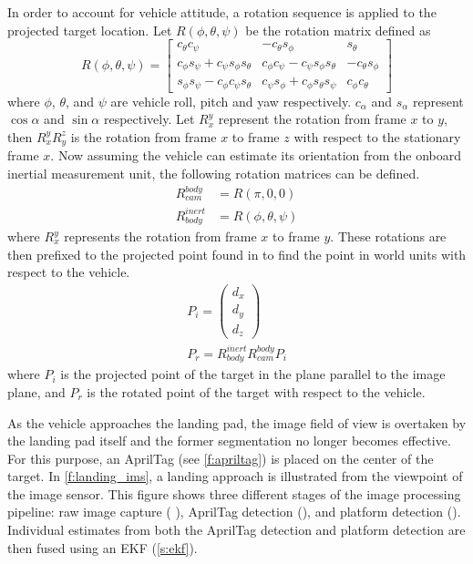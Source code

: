 In order to account for vehicle attitude, a rotation sequence is applied to the projected target location.
Let $R\left(\phi, \theta, \psi\right)$ be the rotation matrix defined as
\begin{equation}
    R(\phi,\theta,\psi) = 
    \begin{bmatrix}
            c_{\theta}c_{\psi}                           & -c_{\theta}s_{\phi}                           & s_{\theta}\\
            c_{\phi}s_{\psi} + c_{\psi}s_{\phi}s_{\theta} & c_{\phi}c_{\psi} - c_{\psi}s_{\phi}s_{\theta} & -c_{\theta}s_{\phi}\\
            s_{\phi}s_{\psi} -c_{\phi}c_{\psi}s_{\theta} & c_{\psi}s_{\phi} + c_{\phi}s_{\theta}s_{\psi} & c_{\phi}c_{\theta}
    \end{bmatrix}
\end{equation}
where $\phi$, $\theta$, and $\psi$ are vehicle roll, pitch and yaw respectively. $c_{\alpha}$ and $s_{\alpha}$
represent $\cos{\alpha}$ and $\sin{\alpha}$ respectively. Let $R_x^y$ represent the rotation from frame $x$ to
$y$, then $R_x^yR_y^z$ is the rotation from frame $x$ to frame $z$ with respect to the stationary frame $x$.
Now assuming the vehicle can estimate its orientation from the onboard inertial measurement unit, the
following rotation matrices can be defined.
\begin{align}
    R_{cam}^{body}   & = R(\pi, 0, 0)\label{e:rot_cam_bod}\\
    R_{body}^{inert} & = R(\phi, \theta, \psi)\label{e:rot_body_inert}
\end{align}
where $R_{x}^{y}$ represents the rotation from frame $x$ to frame $y$. These rotations are then prefixed to the
projected point found  in  to find the point in world units with respect
to the vehicle.
\begin{align}\label{e:rotate}
    P_i = \begin{pmatrix}d_x\\d_y\\d_z\end{pmatrix}\\
    P_r = R_{body}^{inert}R_{cam}^{body}P_i
\end{align}
where $P_i$ is the projected point of the target in the plane parallel to the image plane, and $P_r$ is the
rotated point of the target with respect to the vehicle.

As the vehicle approaches the landing pad, the image field of view is overtaken by the landing pad itself and
the former segmentation no longer becomes effective. For this purpose, an AprilTag\cite{olson2011tags} (see
\cref{f:apriltag}) is placed on the center of the target. In \cref{f:landing_ims}, a landing approach is
illustrated from the viewpoint of the image sensor. This figure shows three different stages of the image
processing pipeline: raw image capture ( ), AprilTag detection
(), and platform detection (). Individual estimates from
both the AprilTag detection and platform detection are then fused using an EKF (\cref{s:ekf}). 

